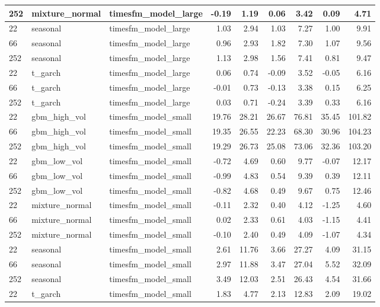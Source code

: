 {\begin{tabular}{lllrrrrrr}
252 & mixture\_normal & timesfm\_model\_large & -0.19 & 1.19 & 0.06 & 3.42 & 0.09 & 4.71 \\
\midrule
22 & seasonal & timesfm\_model\_large & 1.03 & 2.94 & 1.03 & 7.27 & 1.00 & 9.91 \\
66 & seasonal & timesfm\_model\_large & 0.96 & 2.93 & 1.82 & 7.30 & 1.07 & 9.56 \\
252 & seasonal & timesfm\_model\_large & 1.13 & 2.98 & 1.56 & 7.41 & 0.81 & 9.47 \\
\midrule
22 & t\_garch & timesfm\_model\_large & 0.06 & 0.74 & -0.09 & 3.52 & -0.05 & 6.16 \\
66 & t\_garch & timesfm\_model\_large & -0.01 & 0.73 & -0.13 & 3.38 & 0.15 & 6.25 \\
252 & t\_garch & timesfm\_model\_large & 0.03 & 0.71 & -0.24 & 3.39 & 0.33 & 6.16 \\
\midrule
22 & gbm\_high\_vol & timesfm\_model\_small & 19.76 & 28.21 & 26.67 & 76.81 & 35.45 & 101.82 \\
66 & gbm\_high\_vol & timesfm\_model\_small & 19.35 & 26.55 & 22.23 & 68.30 & 30.96 & 104.23 \\
252 & gbm\_high\_vol & timesfm\_model\_small & 19.29 & 26.73 & 25.08 & 73.06 & 32.36 & 103.20 \\
\midrule
22 & gbm\_low\_vol & timesfm\_model\_small & -0.72 & 4.69 & 0.60 & 9.77 & -0.07 & 12.17 \\
66 & gbm\_low\_vol & timesfm\_model\_small & -0.99 & 4.83 & 0.54 & 9.39 & 0.39 & 12.11 \\
252 & gbm\_low\_vol & timesfm\_model\_small & -0.82 & 4.68 & 0.49 & 9.67 & 0.75 & 12.46 \\
\midrule
22 & mixture\_normal & timesfm\_model\_small & -0.11 & 2.32 & 0.40 & 4.12 & -1.25 & 4.60 \\
66 & mixture\_normal & timesfm\_model\_small & 0.02 & 2.33 & 0.61 & 4.03 & -1.15 & 4.41 \\
252 & mixture\_normal & timesfm\_model\_small & -0.10 & 2.40 & 0.49 & 4.09 & -1.07 & 4.34 \\
\midrule
22 & seasonal & timesfm\_model\_small & 2.61 & 11.76 & 3.66 & 27.27 & 4.09 & 31.15 \\
66 & seasonal & timesfm\_model\_small & 2.97 & 11.88 & 3.47 & 27.04 & 5.52 & 32.09 \\
252 & seasonal & timesfm\_model\_small & 3.49 & 12.03 & 2.51 & 26.43 & 4.54 & 31.66 \\
\midrule
22 & t\_garch & timesfm\_model\_small & 1.83 & 4.77 & 2.13 & 12.83 & 2.09 & 19.02 \\

\end{tabular}}
